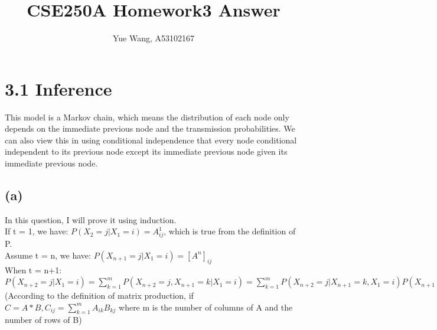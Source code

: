 \documentclass [11pt, a4paper, oneside] {article}
\author {Yue Wang, A53102167}
\title {CSE250A Homework3 Answer}
\begin{document}
\maketitle
\section *{3.1 Inference}
This model is a Markov chain, which means the distribution of each node only depends on the immediate previous node and the transmission probabilities. We can also view this in using conditional independence that every node conditional independent to its previous node except its immediate previous node given its immediate previous node.\\
\subsection *{(a)}
In this question, I will prove it using induction.\\
If t = 1, we have: $P(X_{2}=j|X_1=i) = A^1_{ij}$, which is true from the definition of P.\\
Assume t = n, we have:
$P(X_{n+1}=j|X_1=i) = [A^n]_{ij}$\\
When t = n+1:\\
$P(X_{n+2}=j|X_1=i) = \sum\limits_{k=1}^{m}P(X_{n+2}=j, X_{n+1}=k|X_1=i) = \sum\limits_{k=1}^{m}P(X_{n+2}=j|X_{n+1}=k, X_1=i)P(X_{n+1}=k| X_1=i)
 = \sum\limits_{k=1}^{m}P(X_{n+2}=j|X_{n+1}=k)P(X_{n+1}=k| X_1=i) = \sum\limits_{k=1}^{m}A_{kj}*[A^n]_{ik} = \sum\limits_{k=1}^{m}[A^n]_{ik}*A_{kj} 
 = [A]^{n+1}_{ij} $\\ (According to the definition of matrix production, if $C = A*B, C_{ij} = \sum\limits_{k=1}^{m}A_{ik}B_{kj}$ where m is the number of columns of A and the number of rows of B)\\
\end{document}
